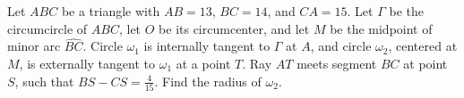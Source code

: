 Let $ABC$ be a triangle with $AB=13$, $BC=14$, and $CA=15$. Let $\Gamma$ be the circumcircle of $ABC$, let $O$ be its circumcenter, and let $M$ be the midpoint of minor arc $\widehat{BC}$. Circle $\omega_1$ is internally tangent to $\Gamma$ at $A$, and circle $\omega_2$, centered at $M$, is externally tangent to $\omega_1$ at a point $T$. Ray $AT$ meets segment $BC$ at point $S$, such that $BS-CS=\frac{4}{15}$. Find the radius of $\omega_2$.